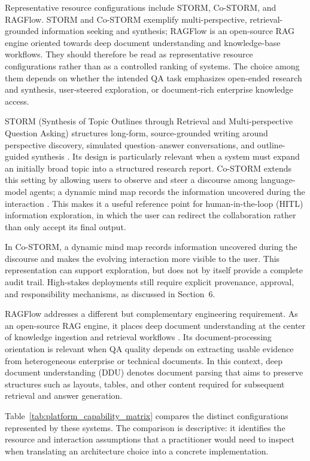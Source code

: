 \documentclass[a4paper,fleqn]{cas-dc}
\begin{document}
Representative resource configurations include STORM, Co-STORM, and RAGFlow.
STORM and Co-STORM exemplify multi-perspective,
retrieval-grounded information seeking and synthesis; RAGFlow is an
open-source RAG engine oriented towards deep document understanding and
knowledge-base workflows. They should therefore be read as representative
resource configurations rather than as a controlled ranking of systems. The
choice among them depends on whether the intended QA task emphasizes
open-ended research and synthesis, user-steered exploration, or document-rich
enterprise knowledge access.

STORM (Synthesis of Topic Outlines through Retrieval and Multi-perspective
Question Asking) structures long-form, source-grounded writing around
perspective discovery, simulated question--answer conversations, and
outline-guided synthesis \citep{shao2024storm}. Its design is particularly
relevant when a system must expand an initially broad topic into a structured
research report. Co-STORM extends this setting by allowing users to observe
and steer a discourse among language-model agents; a dynamic mind map records
the information uncovered during the interaction \citep{shao2024costorm}.
This makes it a useful reference point for human-in-the-loop (HITL)
information exploration, in which the user can redirect the collaboration
rather than only accept its final output.

In Co-STORM, a dynamic mind map records information uncovered during the
discourse and makes the evolving interaction more visible to the user. This
representation can support exploration, but does not by itself provide a
complete audit trail. High-stakes deployments still require explicit
provenance, approval, and responsibility mechanisms, as discussed in
Section~6.

RAGFlow addresses a different but complementary engineering requirement. As
an open-source RAG engine, it places deep document understanding at the center
of knowledge ingestion and retrieval workflows \citep{ragflow2024}. Its
document-processing orientation is relevant when QA quality depends on
extracting usable evidence from heterogeneous enterprise or technical
documents. In this context, deep document understanding (DDU) denotes
document parsing that aims to preserve structures such as layouts, tables, and
other content required for subsequent retrieval and answer generation.

Table~\ref{tab:platform_capability_matrix} compares the distinct
configurations represented by these systems. The comparison is descriptive:
it identifies the resource and interaction assumptions that a practitioner
would need to inspect when translating an architecture choice into a concrete
implementation.
\end{document}
